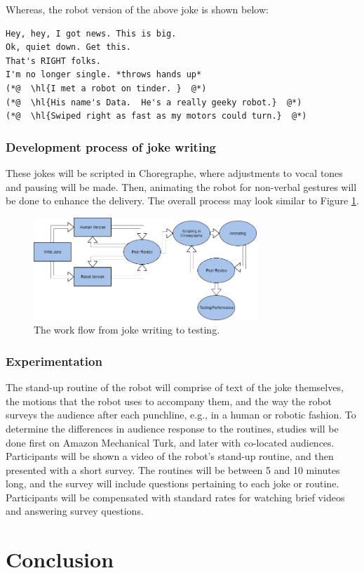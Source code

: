 \documentclass[onecolumn, draftclsnofoot,10pt, compsoc]{IEEEtran}
\begin{document}
Whereas, the robot version of the above joke is shown below:

\begin{lstlisting}
Hey, hey, I got news. This is big.
Ok, quiet down. Get this.
That's RIGHT folks.
I'm no longer single. *throws hands up*
(*@  \hl{I met a robot on tinder. }  @*)
(*@  \hl{His name's Data.  He's a really geeky robot.}  @*)
(*@  \hl{Swiped right as fast as my motors could turn.}  @*)
\end{lstlisting}

\subsubsection{Development process of joke writing}
These jokes will be scripted in Choregraphe, where adjustments to vocal tones and pausing will be made.
Then, animating the robot for non-verbal gestures will be done to enhance the delivery.
The overall process may look similar to Figure \ref{fig:write_process}.

\begin{figure}[H]
  \centering
  \includegraphics[width=0.75\textwidth,height=0.75\textheight,keepaspectratio]{joke_writing_process}
  \caption{The work flow from joke writing to testing.}
	\label{fig:write_process}
\end{figure}

\subsubsection{Experimentation}
The stand-up routine of the robot will comprise of text of the joke themselves, the motions that the robot uses to accompany them, and the way the robot surveys the audience after each punchline, e.g., in a human or robotic fashion.
To determine the differences in audience response to the routines, studies will be done first on Amazon Mechanical Turk, and later with co-located audiences.
Participants will be shown a video of the robot's stand-up routine, and then presented with a short survey.
The routines will be between 5 and 10 minutes long, and the survey will include questions pertaining to each joke or routine.
Participants will be compensated with standard rates for watching brief videos and answering survey questions.


\section{Conclusion}

\pagebreak


% 
% 
\end{document}
